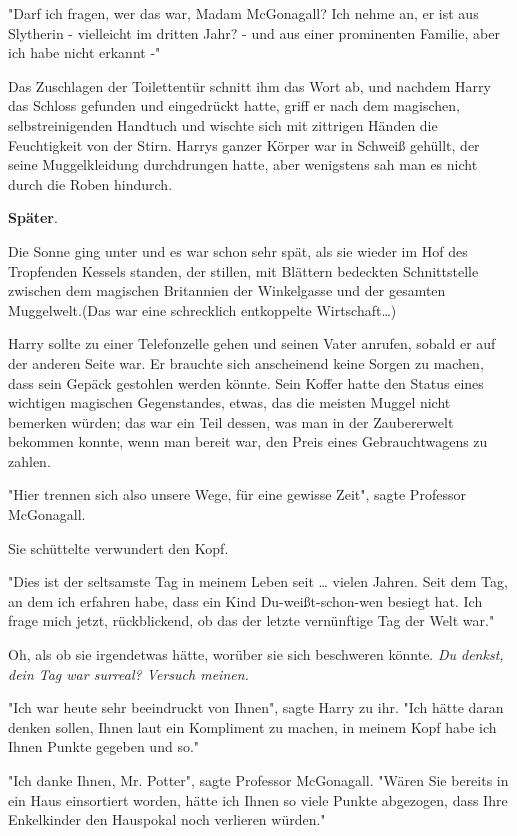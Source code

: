 {"Darf ich fragen, wer das war, Madam McGonagall? Ich nehme an, er ist aus Slytherin - vielleicht im dritten Jahr? - und aus einer prominenten Familie, aber ich habe nicht erkannt -"

Das Zuschlagen der Toilettentür schnitt ihm das Wort ab, und nachdem Harry das Schloss gefunden und eingedrückt hatte, griff er nach dem magischen, selbstreinigenden Handtuch und wischte sich mit zittrigen Händen die Feuchtigkeit von der Stirn. Harrys ganzer Körper war in Schweiß gehüllt, der seine Muggelkleidung durchdrungen hatte, aber wenigstens sah man es nicht durch die Roben hindurch.

\textbf{Später}.

Die Sonne ging unter und es war schon sehr spät, als sie wieder im Hof des Tropfenden Kessels standen, der stillen, mit Blättern bedeckten Schnittstelle zwischen dem magischen Britannien der Winkelgasse und der gesamten Muggelwelt.(Das war eine schrecklich entkoppelte Wirtschaft…)

Harry sollte zu einer Telefonzelle gehen und seinen Vater anrufen, sobald er auf der anderen Seite war. Er brauchte sich anscheinend keine Sorgen zu machen, dass sein Gepäck gestohlen werden könnte. Sein Koffer hatte den Status eines wichtigen magischen Gegenstandes, etwas, das die meisten Muggel nicht bemerken würden; das war ein Teil dessen, was man in der Zaubererwelt bekommen konnte, wenn man bereit war, den Preis eines Gebrauchtwagens zu zahlen.

"Hier trennen sich also unsere Wege, für eine gewisse Zeit", sagte Professor McGonagall.

Sie schüttelte verwundert den Kopf.

"Dies ist der seltsamste Tag in meinem Leben seit … vielen Jahren. Seit dem Tag, an dem ich erfahren habe, dass ein Kind Du-weißt-schon-wen besiegt hat. Ich frage mich jetzt, rückblickend, ob das der letzte vernünftige Tag der Welt war."

Oh, als ob sie irgendetwas hätte, worüber sie sich beschweren könnte. \emph{Du denkst, dein Tag war surreal? Versuch meinen.}

"Ich war heute sehr beeindruckt von Ihnen", sagte Harry zu ihr. "Ich hätte daran denken sollen, Ihnen laut ein Kompliment zu machen, in meinem Kopf habe ich Ihnen Punkte gegeben und so."

"Ich danke Ihnen, Mr. Potter", sagte Professor McGonagall. "Wären Sie bereits in ein Haus einsortiert worden, hätte ich Ihnen so viele Punkte abgezogen, dass Ihre Enkelkinder den Hauspokal noch verlieren würden."

}
